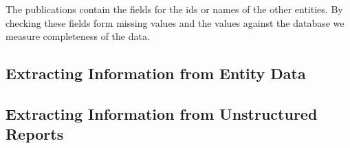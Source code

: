 The publications contain the fields for the ids or names of the other entities. By checking these fields form missing values and the values against the database we measure completeness of the data.

\subsection{Extracting Information from Entity Data}
\subsection{Extracting Information from Unstructured Reports}


\begin{comment}
\paragraph{Database normalization}
This leads to unwanted duplication as names can be written in many different forms and typos can be introduced, 

We need to define so-called master data for judges and administrators containing the real world entities. The two data sources in the sections \ref{NOvA Tableau} and \ref{Nevenfuncties Rechters} are chosen for this purpose. CIR entity names are first normalized for de-duplication and are subsequently linked to the master data records on their normalized name. 

\paragraph{PDF report web service}




The number of current defaults is about the lowest of the century [ref] [graph of declining defaults]






\subsection{Implementation challenges}
\subsubsection{Entity De-duplication, Scraping and Linking}
\paragraph{Deduplication: normalizing names}
CIR provides administrator names in four parts: title, initials, middle part and family name. 


\end{comment}
